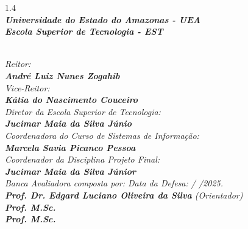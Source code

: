 \begin{spacing}{1.4}
\textit{\textbf{\\
Universidade do Estado do Amazonas - UEA\\
Escola Superior de Tecnologia - EST}}

\textit{\\
Reitor:\\
\textbf{Andr\'{e} Luiz Nunes Zogahib}\\
Vice-Reitor:\\ \textbf{Kátia do Nascimento Couceiro}}
\\
\textit{
Diretor da Escola Superior de Tecnologia:\\
\textbf{Jucimar Maia da Silva J\'{u}nio}}
\\
\textit{
Coordenadora do Curso de Sistemas de Informa\c{c}\~{a}o:\\
\textbf{Marcela Savia Picanco Pessoa}}
\\
\textit{
Coordenador da Disciplina Projeto Final:\\
\textbf{Jucimar Maia da Silva J\'{u}nior}}
\\[12pt]
\textit{
Banca Avaliadora composta por: \hfill Data da Defesa:  /  /2025.\\
}
\textit{
\textbf{Prof. Dr. Edgard Luciano Oliveira da Silva} (Orientador)\\
\textbf{Prof. M.Sc. }\\%
\textbf{Prof. M.Sc. }
}
\ \ \\
 \begin{small}
\begin{center}
\end{center}
\end{small}
\end{spacing}
 \newpage
